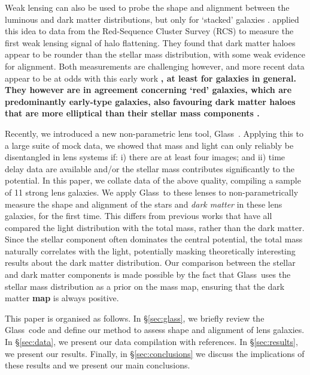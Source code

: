 \documentclass[useAMS,usenatbib]{mn2e}
\def\Glass{{\sc Glass}}
\newcommand{\cb}[1]{{\color{red} \textbf{#1}}}
\begin{document}
Weak lensing can also be used to probe the shape and alignment between the luminous and dark matter distributions, but only for `stacked' galaxies \citep{2000astro.ph..6281B,2000ApJ...538L.113N}. \citet{2004ApJ...606...67H} applied this idea to data from the Red-Sequence Cluster Survey (RCS) to measure the first weak lensing signal of halo flattening. They found that dark matter haloes appear to be rounder than the stellar mass distribution, with some weak evidence for alignment. Both measurements are challenging however, and more recent data appear to be at odds with this early work\cb{, at least for galaxies in general. They however are in agreement concerning `red' galaxies, which are predominantly early-type galaxies, also favouring dark matter haloes that are more elliptical than their stellar mass components \citep{2006MNRAS.370.1008M,2007ApJ...669...21P,2012A&A...545A..71V}.}

Recently, we introduced a new non-parametric lens tool, \Glass\ \citep{2014arXiv1401.7990C}. Applying this to a large suite of mock data, we showed that mass and light can only reliably be disentangled in lens systems if: i) there are at least four images; and ii) time delay data are available and/or the stellar mass contributes significantly to the potential. In this paper, we collate data of the above quality, compiling a sample of 11 strong lens galaxies. We apply \Glass\ to these lenses to non-parametrically measure the shape and alignment of the stars and {\it dark matter} in these lens galaxies, for the first time. This differs from previous works that have all compared the light distribution with the total mass, rather than the dark matter. Since the stellar component often dominates the central potential, the total mass naturally correlates with the light, potentially masking theoretically interesting results about the dark matter distribution. Our comparison between the stellar and dark matter components is made possible by the fact that \Glass\ uses the stellar mass distribution as a prior on the mass map, ensuring that the dark matter \cb{map} is always positive.

This paper is organised as follows. In \S\ref{sec:glass}, we briefly review the \Glass\ code and define our method to assess shape and alignment of lens galaxies. In \S\ref{sec:data}, we present our data compilation with references. In \S\ref{sec:results}, we present our results. Finally, in \S\ref{sec:conclusions} we discuss the implications of these results and we present our main conclusions.
\end{document}
